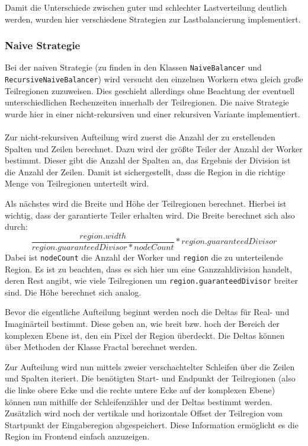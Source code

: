 Damit die Unterschiede zwischen guter und schlechter Lastverteilung deutlich werden, wurden hier verschiedene Strategien zur Lastbalancierung implementiert.

\subsubsection{Naive Strategie}

Bei der naiven Strategie (zu finden in den Klassen \verb|NaiveBalancer| und \\ \verb|RecursiveNaiveBalancer|) wird versucht den einzelnen Workern etwa gleich große Teilregionen zuzuweisen.
Dies geschieht allerdings ohne Beachtung der eventuell unterschiedlichen Rechenzeiten innerhalb der Teilregionen.
Die naive Strategie wurde hier in einer nicht-rekursiven  und einer rekursiven Variante implementiert.

\paragraph*{} \label{lastbalancierung_naiv}
Zur nicht-rekursiven Aufteilung wird zuerst die Anzahl der zu erstellenden Spalten und Zeilen berechnet.
Dazu wird der größte Teiler der Anzahl der Worker bestimmt. Dieser gibt die Anzahl der Spalten an, das Ergebnis der Division ist die Anzahl der Zeilen.
Damit ist sichergestellt, dass die Region in die richtige Menge von Teilregionen unterteilt wird.

Als nächstes wird die Breite und Höhe der Teilregionen berechnet. Hierbei ist wichtig, dass der garantierte Teiler erhalten wird.
Die Breite berechnet sich also durch:
\begin{equation*}
	\frac{region.width}{region.guaranteedDivisor * nodeCount} * region.guaranteedDivisor
\end{equation*}
Dabei ist \verb|nodeCount| die Anzahl der Worker und \verb|region| die zu unterteilende Region.
Es ist zu beachten, dass es sich hier um eine Ganzzahldivision handelt, deren Rest angibt, wie viele Teilregionen um \verb|region.guaranteedDivisor| breiter sind.
Die Höhe berechnet sich analog.

Bevor die eigentliche Aufteilung beginnt werden noch die Deltas für Real- und Imaginärteil bestimmt.
Diese geben an, wie breit bzw. hoch der Bereich der komplexen Ebene ist, den ein Pixel der Region überdeckt.
Die Deltas können über Methoden der Klasse Fractal berechnet werden.

Zur Aufteilung wird nun mittels zweier verschachtelter Schleifen über die Zeilen und Spalten iteriert.
Die benötigten Start- und Endpunkt der Teilregionen (also die linke obere Ecke und die rechte untere Ecke auf der komplexen Ebene) können nun mithilfe der Schleifenzähler und der Deltas bestimmt werden.
Zusätzlich wird noch der vertikale und horizontale Offset der Teilregion vom Startpunkt der Eingaberegion abgespeichert. Diese Information ermöglicht es die Region im Frontend einfach anzuzeigen.

